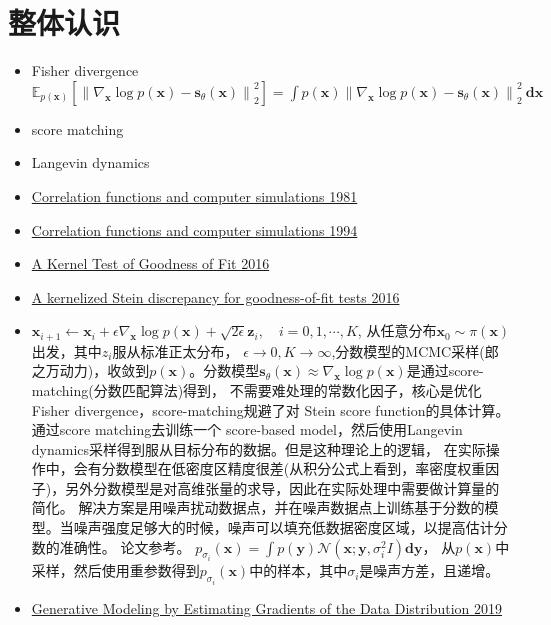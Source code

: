 \section{整体认识}
\begin{itemize}
  \item  Fisher divergence $\mathbb{E}_{p(\mathbf{x})}\left[\left\|\nabla_{\mathbf{x}} \log p(\mathbf{x})-\mathbf{s}_\theta(\mathbf{x})\right\|_2^2\right]=\int p(\mathbf{x})\left\|\nabla_{\mathbf{x}} \log p(\mathbf{x})-\mathbf{s}_\theta(\mathbf{x})\right\|_2^2 \mathbf{~d} \mathbf{x}$
  \item score matching
  \item  Langevin dynamics
  \item \href{c}{Correlation functions and computer simulations 1981}
  \item \href{c}{Correlation functions and computer simulations 1994}
  \item \href{c}{A Kernel Test of Goodness of Fit 2016}
  \item \href{c}{A kernelized Stein discrepancy for goodness-of-fit tests 2016}
  \item $\mathbf{x}_{i+1} \leftarrow \mathbf{x}_i+\epsilon \nabla_{\mathbf{x}} \log p(\mathbf{x})+\sqrt{2 \epsilon} \mathbf{z}_i, \quad i=0,1, \cdots, K$, 从任意分布$\mathbf{x}_0 \sim \pi(\mathbf{x})$出发，其中$z_i$服从标准正太分布，
  $\epsilon \rightarrow 0, K \rightarrow \infty$,分数模型的MCMC采样(郎之万动力)，收敛到$p(\mathbf{x})$。分数模型$\mathbf{s}_\theta(\mathbf{x}) \approx \nabla_{\mathbf{x}} \log p(\mathbf{x})$是通过score-matching(分数匹配算法)得到，
  不需要难处理的常数化因子，核心是优化Fisher divergence，score-matching规避了对 Stein score function的具体计算。
  通过score matching去训练一个 score-based model，然后使用Langevin dynamics采样得到服从目标分布的数据。但是这种理论上的逻辑，
  在实际操作中，会有分数模型在低密度区精度很差(从积分公式上看到，率密度权重因子)，另外分数模型是对高维张量的求导，因此在实际处理中需要做计算量的简化。
  解决方案是用噪声扰动数据点，并在噪声数据点上训练基于分数的模型。当噪声强度足够大的时候，噪声可以填充低数据密度区域，以提高估计分数的准确性。
  论文参考。
  $p_{\sigma_i}(\mathbf{x})=\int p(\mathbf{y}) \mathcal{N}\left(\mathbf{x} ; \mathbf{y}, \sigma_i^2 I\right) \mathbf{d} \mathbf{y}$，
  从$p(\mathbf{x})$中采样，然后使用重参数得到$p_{\sigma_i}(\mathbf{x})$中的样本，其中$\sigma_i$是噪声方差，且递增。
  \item \href{c}{Generative Modeling by Estimating Gradients of the Data Distribution 2019}

\end{itemize}

